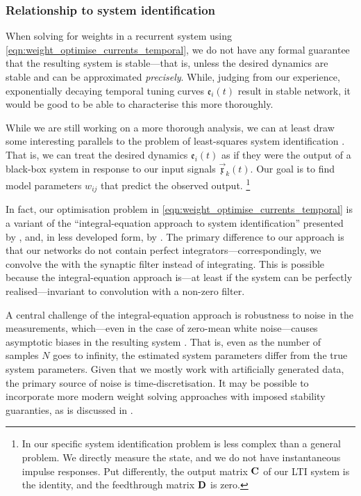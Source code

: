 \subsubsection{Relationship to system identification}
When solving for weights in a recurrent system using \cref{eqn:weight_optimise_currents_temporal}, we do not have any formal guarantee that the resulting system is stable---that is, unless the desired dynamics are stable and can be approximated \emph{precisely}.
While, judging from our experience, exponentially decaying temporal tuning curves $\mathfrak{e}_i(t)$ result in stable network, it would be good to be able to characterise this more thoroughly.

While we are still working on a more thorough analysis, we can at least draw some interesting parallels to the problem of least-squares system identification \citep[cf.][specifically Chapters~7-10]{verhaegen2007filtering}.
That is, we can treat the desired dynamics $\mathfrak{e}_i(t)$ as if they were the output of a black-box system in response to our input signals $\vec{\mathfrak{x}}_k(t)$.
Our goal is to find model parameters $w_{ij}$ that predict the observed output.%
\footnote{In our specific system identification problem is less complex than a general problem.
We directly measure the state, and we do not have instantaneous impulse responses.
Put differently, the output matrix $\mathbf{C}$ of our LTI system is the identity, and the feedthrough matrix $\mathbf{D}$ is zero.}

In fact, our optimisation problem in \cref{eqn:weight_optimise_currents_temporal} is a variant of the \enquote{integral-equation approach to system identification} presented by \citet{whitfield1987integralequation}, and, in less developed form, by \citet{squire1971simple}.
The primary difference to our approach is that our networks do not contain perfect integrators---correspondingly, we convolve the with the synaptic filter instead of integrating.
This is possible because the integral-equation approach is---at least if the system can be perfectly realised---invariant to convolution with a non-zero filter.

A central challenge of the integral-equation approach is robustness to noise in the measurements, which---even in the case of zero-mean white noise---causes asymptotic biases in the resulting system \citep{sagara1989recursive}.
That is, even as the number of samples $N$ goes to infinity, the estimated system parameters differ from the true system parameters.
Given that we mostly work with artificially generated data, the primary source of noise is time-discretisation.
It may be possible to incorporate more modern weight solving approaches with imposed stability guaranties, as is discussed in \citet{verhaegen2007filtering}.

